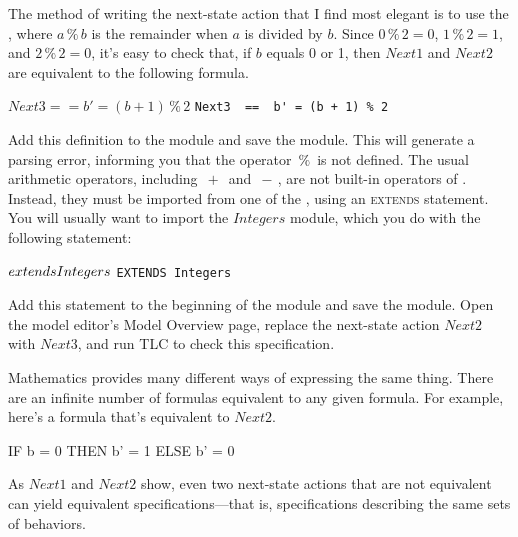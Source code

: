 \documentclass[fleqn,leqno]{article}
\begin{document}
The method of writing the next-state action that I find most
elegant is to use the 
  ,
where $a\,\%\, b$ is the remainder when $a$ is divided by $b$. 
Since $0\,\%\,2 = 0$, $1\,\%\,2 = 1$, and $2\,\%\,2 = 0$,
it's easy to check that, if $b$ equals 0 or 1, then $Next1$ and
$Next2$ are equivalent to the following formula.
\begin{display}
\begin{twocols}
$Next3  ==  b' = (b+1)\,\%\,2$
\midcol
\verb|Next3  ==  b' = (b + 1) % 2|
\end{twocols}
\end{display}
Add this definition to the module and save the module.  This will
generate a parsing error, informing you that the operator \,$\%$\, is
not defined.  The usual arithmetic operators, including $\,+\,$ and
$\,-\,$, are not built-in operators of \tlaplus.  Instead, they must be
imported from one of the , using an \textsc{extends} statement.
You will usually want to import the 
$Integers$ module, which you do
with the following statement:%
\begin{display}
\begin{twocols}
$\EXTENDS Integers$%
\midcol
\verb|EXTENDS Integers|
\end{twocols}
\end{display}
Add this statement to the 
beginning%
of the module and save the module.  Open the model editor's
\textsf{Model Overview} page, replace the next-state action $Next2$
with $Next3$, and run TLC to check this specification.

\pause

\noindent
Mathematics provides many different ways of expressing the same thing.
There are an infinite number of formulas equivalent to any given
formula.  For example, here's a formula that's equivalent to 
$Next2$.
\begin{display}
\begin{notla}
IF b = 0 THEN b' = 1
         ELSE b' = 0
\end{notla}
\begin{tlatex}
%
%
\end{tlatex}
\end{display}
As $Next1$ and $Next2$ show, even two next-state actions that are not
equivalent can yield equivalent specifications---that is,
specifications describing the same sets of behaviors.
\end{document}
